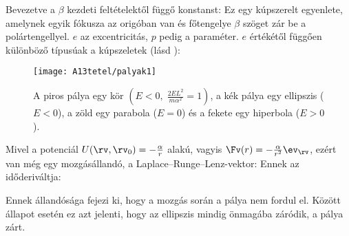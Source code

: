    Bevezetve a $\beta$ kezdeti feltételektől függő konstanst:
   Ez egy kúpszerelt egyenlete, amelynek egyik fókusza az origóban van és főtengelye $\beta$ szöget zár be a polártengellyel. $e$ az excentricitás, $p$ pedig a paraméter. $e$ értékétől függően különböző típusúak a kúpszeletek (lásd ):
   \begin{figure}[ht!]
    \centering
    \texttt{[image: A13tetel/palyak1]}
    \caption{A piros pálya egy kör $\left(E<0,\;\frac{2EL^2}{m\alpha^2}=1\right)$, a kék pálya egy ellipszis ($E<0$), a zöld egy parabola ($E=0$) és a fekete egy hiperbola ($E>0$). }\label{fig:A13-palyak}
   \end{figure}

   Mivel a potenciál $U(\rv,\rv_0)=-\frac{\alpha}{r}$ alakú, vagyis $\Fv(r)=-\frac{\alpha}{r^2}\ev_\rv$, ezért van még egy mozgásállandó, a Laplace--Runge--Lenz-vektor:
   Ennek az időderiváltja:
   
   Ennek állandósága fejezi ki, hogy a mozgás során a pálya nem fordul el.
   Között állapot esetén ez azt jelenti, hogy az ellipszis mindig önmagába záródik, a pálya zárt. 
   
